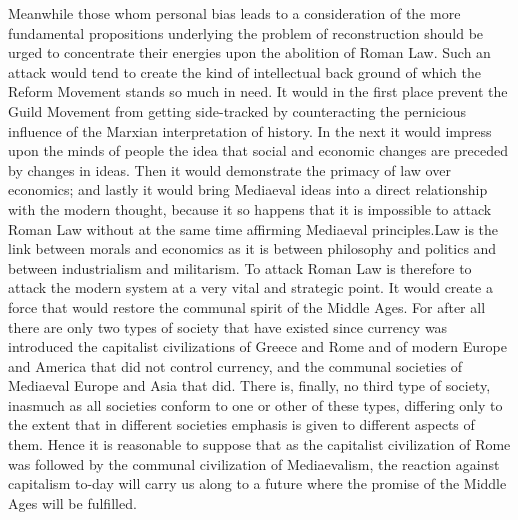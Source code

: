 \documentclass{book}
\begin{document}
Meanwhile those whom personal bias leads to a consideration of the more fundamental propositions underlying the problem of reconstruction should be urged to concentrate their energies upon the abolition of Roman Law. Such an attack would tend to create the kind of intellectual back ground of which the Reform Movement stands so much in need. It would in the first place prevent the Guild Movement from getting side-tracked by counteracting the pernicious influence of the Marxian interpretation of history. In the next it would impress upon the minds of people the idea that social and economic changes are preceded by changes in ideas. Then it would demonstrate the primacy of law over economics; and lastly it would bring Mediaeval ideas into a direct relationship with the modern thought, because it so happens that it is impossible to attack Roman Law without at the same time affirming Mediaeval principles.\footnotemark[2] Law is the link between morals and economics as it is between philosophy and politics and between industrialism and militarism. To attack Roman Law is therefore to attack the modern system at a very vital and strategic point. It would create a force that would restore the communal spirit of the Middle Ages. For after all there are only two types of society that have existed since currency was introduced the capitalist civilizations of Greece and Rome and of modern Europe and America that did not control currency, and the communal societies of Mediaeval Europe and Asia that did. There is, finally, no third type of society, inasmuch as all societies conform to one or other of these types, differing only to the extent that in different societies emphasis is given to different aspects of them. Hence it is reasonable to suppose that as the capitalist civilization of Rome was followed by the communal civilization of Mediaevalism, the reaction against capitalism to-day will carry us along to a future where the promise of the Middle Ages will be fulfilled.

\end{document}
